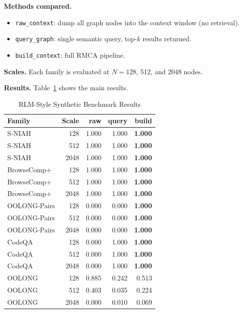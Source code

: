 \documentclass[conference]{IEEEtran}
\begin{document}
\textbf{Methods compared.}
\begin{itemize}
\item \texttt{raw\_context}: dump all graph nodes into the context window (no retrieval).
\item \texttt{query\_graph}: single semantic query, top-$k$ results returned.
\item \texttt{build\_context}: full RMCA pipeline.
\end{itemize}

\textbf{Scales.} Each family is evaluated at $N = 128$, 512, and 2048 nodes.

\textbf{Results.} Table~\ref{tab:rlm_main} shows the main results.

\begin{table}[htbp]
\caption{RLM-Style Synthetic Benchmark Results}
\label{tab:rlm_main}
\centering
\begin{tabular}{lrrrr}
\toprule
\textbf{Family} & \textbf{Scale} & \textbf{raw} & \textbf{query} & \textbf{build} \\
\midrule
S-NIAH       & 128  & 1.000 & 1.000 & \textbf{1.000} \\
S-NIAH       & 512  & 1.000 & 1.000 & \textbf{1.000} \\
S-NIAH       & 2048 & 1.000 & 1.000 & \textbf{1.000} \\
\midrule
BrowseComp+  & 128  & 1.000 & 1.000 & \textbf{1.000} \\
BrowseComp+  & 512  & 1.000 & 1.000 & \textbf{1.000} \\
BrowseComp+  & 2048 & 1.000 & 1.000 & \textbf{1.000} \\
\midrule
OOLONG-Pairs & 128  & 0.000 & 0.000 & \textbf{1.000} \\
OOLONG-Pairs & 512  & 0.000 & 0.000 & \textbf{1.000} \\
OOLONG-Pairs & 2048 & 0.000 & 0.000 & \textbf{1.000} \\
\midrule
CodeQA       & 128  & 0.000 & 1.000 & \textbf{1.000} \\
CodeQA       & 512  & 0.000 & 1.000 & \textbf{1.000} \\
CodeQA       & 2048 & 0.000 & 1.000 & \textbf{1.000} \\
\midrule
OOLONG       & 128  & 0.885 & 0.242 & 0.513 \\
OOLONG       & 512  & 0.403 & 0.035 & 0.224 \\
OOLONG       & 2048 & 0.000 & 0.010 & 0.069 \\
\bottomrule
\end{tabular}
\end{table}
\end{document}
